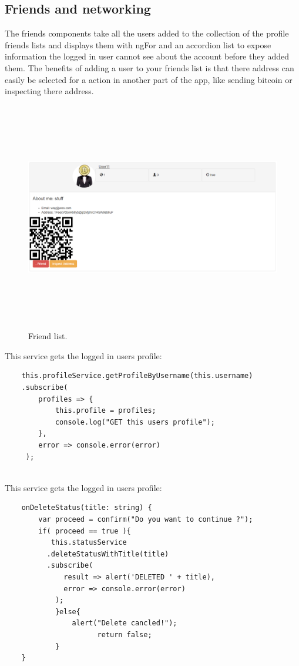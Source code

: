 \subsection{Friends and networking}
The friends components take all the users added to the collection of the profile friends lists and displays them with ngFor and an accordion list to expose information the logged in user cannot see about the account before they added them. The benefits of adding a user to your friends list is that there address can easily be selected for a action in another part of the app, like sending bitcoin or inspecting there address.

\begin{figure}[H]
\centering
\includegraphics[width=20cm, height=10cm]{img/FriendsList.png}
\caption{Friend list.}
\end{figure}

This service gets the logged in users profile:
\begin{lstlisting}
    this.profileService.getProfileByUsername(this.username)
    .subscribe(
        profiles => {
            this.profile = profiles;
            console.log("GET this users profile");  
        },
        error => console.error(error)
     );
    
\end{lstlisting}

This service gets the logged in users profile:
\begin{lstlisting}
    onDeleteStatus(title: string) {
        var proceed = confirm("Do you want to continue ?");
        if( proceed == true ){
           this.statusService
          .deleteStatusWithTitle(title)
          .subscribe(
              result => alert('DELETED ' + title),
              error => console.error(error)
            );
            }else{
                alert("Delete cancled!");
                      return false;
            }
    }
  
\end{lstlisting}

